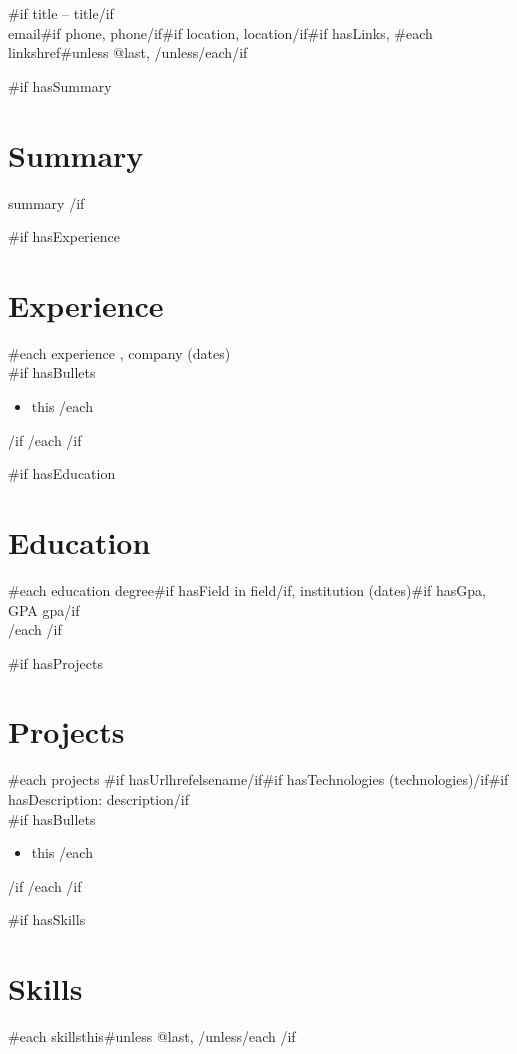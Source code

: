 \documentclass[10pt,a4paper]{article}
\begin{document}
{\large {}\relax{}}{{#if title}} -- {{title}}{{/if}}\\
{{email}}{{#if phone}}, {{phone}}{{/if}}{{#if location}}, {{location}}{{/if}}{{#if hasLinks}}, {{#each links}}{{href}}{{#unless @last}}, {{/unless}}{{/each}}{{/if}}

\vspace{6pt}

{{#if hasSummary}}
\section*{Summary}
{{summary}}
{{/if}}

{{#if hasExperience}}
\section*{Experience}
{{#each experience}}
\textbf{\relax{}}, {{company}} ({{dates}})\\
{{#if hasBullets}}
\begin{itemize}
{{#each bullets}}\item {{this}}
{{/each}}
\end{itemize}
{{/if}}
{{/each}}
{{/if}}

{{#if hasEducation}}
\section*{Education}
{{#each education}}
{{degree}}{{#if hasField}} in {{field}}{{/if}}, {{institution}} ({{dates}}){{#if hasGpa}}, GPA {{gpa}}{{/if}}\\
{{/each}}
{{/if}}

{{#if hasProjects}}
\section*{Projects}
{{#each projects}}
{{#if hasUrl}}{{href}}{{else}}{{name}}{{/if}}{{#if hasTechnologies}} ({{technologies}}){{/if}}{{#if hasDescription}}: {{description}}{{/if}}\\
{{#if hasBullets}}
\begin{itemize}
{{#each bullets}}\item {{this}}
{{/each}}
\end{itemize}
{{/if}}
{{/each}}
{{/if}}

{{#if hasSkills}}
\section*{Skills}
{{#each skills}}{{this}}{{#unless @last}}, {{/unless}}{{/each}}
{{/if}}
\end{document}
